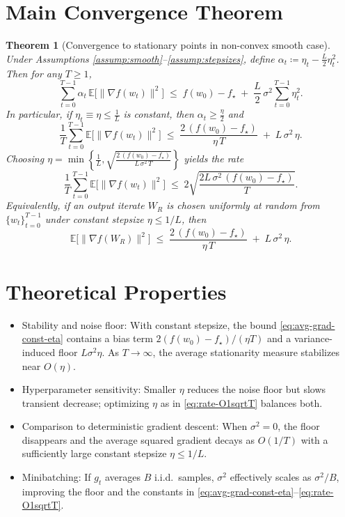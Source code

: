 \documentclass[11pt]{article}
\newtheorem{theorem}{Theorem}
\begin{document}
\section*{Main Convergence Theorem}
\begin{theorem}[Convergence to stationary points in non-convex smooth case]
\label{thm:nonconvex}
Under Assumptions \ref{assump:smooth}--\ref{assump:stepsizes}, define $\alpha_t \coloneqq \eta_t - \frac{L}{2}\eta_t^2$. Then for any $T\ge 1$,
\begin{equation}
\sum_{t=0}^{T-1} \alpha_t \,\mathbb{E}\big[\|\nabla f(w_t)\|^2\big]
\;\le\; f(w_0) - f_\star \;+\; \frac{L}{2}\,\sigma^2 \sum_{t=0}^{T-1} \eta_t^2.
\label{eq:key-sum}
\end{equation}
In particular, if $\eta_t\equiv \eta \le \frac{1}{L}$ is constant, then $\alpha_t \ge \frac{\eta}{2}$ and
\begin{equation}
\frac{1}{T}\sum_{t=0}^{T-1} \mathbb{E}\big[\|\nabla f(w_t)\|^2\big]
\;\le\; \frac{2\,(f(w_0)-f_\star)}{\eta\,T} \;+\; L\,\sigma^2\,\eta.
\label{eq:avg-grad-const-eta}
\end{equation}
Choosing $\eta = \min\left\{\tfrac{1}{L}, \sqrt{\tfrac{2\,(f(w_0)-f_\star)}{L\,\sigma^2\,T}}\right\}$ yields the rate
\begin{equation}
\frac{1}{T}\sum_{t=0}^{T-1} \mathbb{E}\big[\|\nabla f(w_t)\|^2\big]
\;\le\; 2\sqrt{\frac{2L\,\sigma^2\,(f(w_0)-f_\star)}{T}}.
\label{eq:rate-O1sqrtT}
\end{equation}
Equivalently, if an output iterate $W_R$ is chosen uniformly at random from $\{w_t\}_{t=0}^{T-1}$ under constant stepsize $\eta\le 1/L$, then
\begin{equation}
\mathbb{E}\big[\|\nabla f(W_R)\|^2\big]
\;\le\; \frac{2\,(f(w_0)-f_\star)}{\eta\,T} \;+\; L\,\sigma^2\,\eta.
\label{eq:uniform-output}
\end{equation}
\end{theorem}

\section*{Theoretical Properties}
\begin{itemize}
    \item Stability and noise floor: With constant stepsize, the bound \eqref{eq:avg-grad-const-eta} contains a bias term $2(f(w_0)-f_\star)/(\eta T)$ and a variance-induced floor $L\sigma^2\eta$. As $T\to\infty$, the average stationarity measure stabilizes near $O(\eta)$.
    \item Hyperparameter sensitivity: Smaller $\eta$ reduces the noise floor but slows transient decrease; optimizing $\eta$ as in \eqref{eq:rate-O1sqrtT} balances both.
    \item Comparison to deterministic gradient descent: When $\sigma^2=0$, the floor disappears and the average squared gradient decays as $O(1/T)$ with a sufficiently large constant stepsize $\eta\le 1/L$.
    \item Minibatching: If $g_t$ averages $B$ i.i.d.\ samples, $\sigma^2$ effectively scales as $\sigma^2/B$, improving the floor and the constants in \eqref{eq:avg-grad-const-eta}--\eqref{eq:rate-O1sqrtT}.
\end{itemize}
\end{document}
